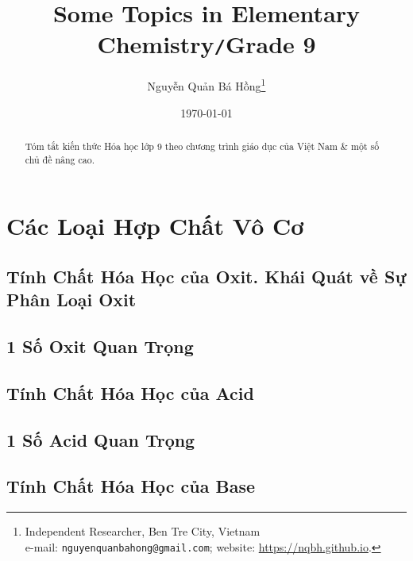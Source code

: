 \documentclass{article}
\title{Some Topics in Elementary Chemistry\texttt{/}Grade 9}
\author{Nguyễn Quản Bá Hồng\footnote{Independent Researcher, Ben Tre City, Vietnam\\e-mail: \texttt{nguyenquanbahong@gmail.com}; website: \url{https://nqbh.github.io}.}}
\date{\today}
\numberwithin{equation}{section}
\begin{document}
\maketitle
\begin{abstract}
	Tóm tắt kiến thức Hóa học lớp 9 theo chương trình giáo dục của Việt Nam \& một số chủ đề nâng cao.
\end{abstract}
\setcounter{secnumdepth}{4}
\setcounter{tocdepth}{3}
\tableofcontents
\newpage


\section{Các Loại Hợp Chất Vô Cơ}

\subsection{Tính Chất Hóa Học của Oxit. Khái Quát về Sự Phân Loại Oxit}


\subsection{1 Số Oxit Quan Trọng}


\subsection{Tính Chất Hóa Học của Acid}


\subsection{1 Số Acid Quan Trọng}


\subsection{Tính Chất Hóa Học của Base}

\end{document}
